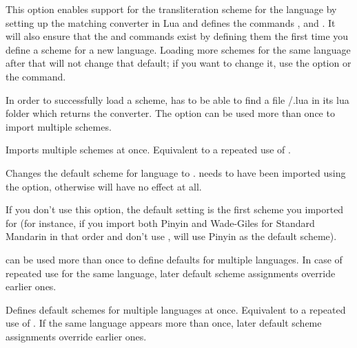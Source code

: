 \documentclass{ltxdockit}
\begin{document}
\begin{optionlist}

  This option enables support for the transliteration scheme  for
  the language  by setting up the matching converter in Lua and
  defines the commands ,
   and
  . It will also ensure that the
   and 
  commands exist by defining them the first time you define a scheme for a new
  language. Loading more schemes for the same language after that will not
  change that default; if you want to change it, use the 
  option or the  command.

  In order to successfully load a scheme, \transconv{} has to be able to find
  a file /.lua in its lua folder which returns the
  converter. The option can be used more than once to import multiple schemes.


  Imports multiple schemes at once. Equivalent to a repeated use of
  .


  Changes the default scheme for language  to .
   needs to have been imported using the  option,
  otherwise  will have no effect at all.

  If you don't use this option, the default setting is the first scheme you
  imported for  (for instance, if you import both Pinyin and
  Wade-Giles for Standard Mandarin in that order and don't use
  , \transconv{} will use Pinyin as the default scheme).

  can be used more than once to define defaults for multiple
 languages. In case of repeated use for the same language, later default scheme
 assignments override earlier ones.


  Defines default schemes for multiple languages at once. Equivalent to a
  repeated use of . If the same language appears more than
  once, later default scheme assignments override earlier ones.

\end{optionlist}
\end{document}
